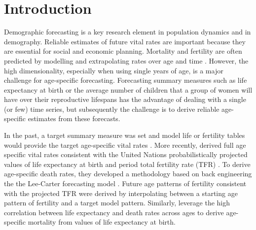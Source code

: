 \documentclass[12pt,a4paper,twoside]{article}
\begin{document}
	
	
	

	\newpage
\setcounter{page}{1}	

\section{Introduction}\label{sec:Intro}

Demographic forecasting is a key research element in population dynamics and in demography. Reliable estimates of future vital rates are important because they are essential for social and economic planning. Mortality and fertility are often predicted by modelling and extrapolating rates over age and time \citep{Booth2006,bohk2018forecast}. However, the high dimensionality, especially when using single years of age, is a major challenge for age-specific forecasting. Forecasting summary measures such as life expectancy at birth or the average number of children that a group of women will have over their reproductive lifespans has the advantage of dealing with a single (or few) time series, but subsequently the challenge is to derive reliable age-specific estimates from these forecasts. 

In the past, a target summary measure was set and model life or fertility tables would provide the target age-specific vital rates \citep{Booth2006}. More recently, \citet{vsevvcikova2016age} derived full age specific vital rates consistent with the United Nations probabilistically projected values of life expectancy at birth and period total fertility rate (TFR) \citep{gerland2014WorldPopulationStabilization}. To derive age-specific death rates, they developed a methodology based on back engineering the the Lee-Carter forecasting model \citep{lee1992modeling}. Future age patterns of fertility consistent with the projected TFR were derived by interpolating between a starting age pattern of fertility and a target model pattern. Similarly, \citet{pascariu2020linear} leverage the high correlation between life expectancy and death rates across ages to derive age-specific mortality from values of life expectancy at birth. 

 
\end{document}
